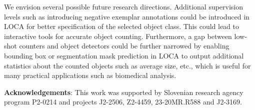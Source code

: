 \documentclass[10pt,twocolumn,letterpaper]{article}
\begin{document}
We envision several possible future research directions. 
Additional supervision levels such as introducing negative exemplar annotations could be introduced in LOCA for better specification of the selected object class. 
This could lead to interactive tools for accurate object counting. Furthermore, a gap between low-shot counters and object detectors could be further narrowed by enabling bounding box or segmentation mask prediction in LOCA to output additional statistics about the counted objects such as average size, etc., which is useful for many practical applications such as biomedical analysis.
 















\hfill 

{\noindent \bf Acknowledgements}:
This work was supported by Slovenian research agency program 
P2-0214 and projects 
J2-2506, Z2-4459, 23-20MR.R588 and 
J2-3169. 


{\small


}
\end{document}
